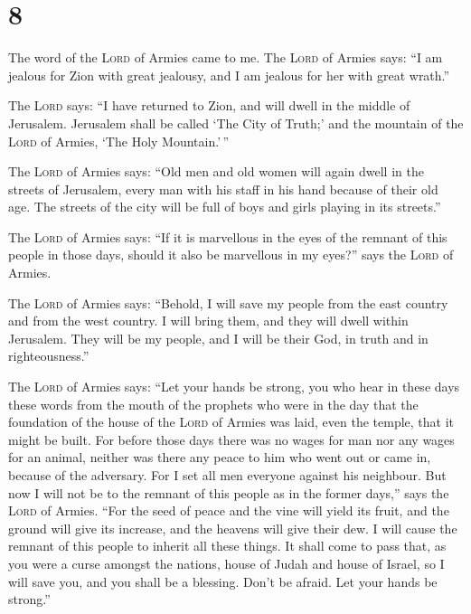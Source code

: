 \hypertarget{section-7}{%
\section{8}\label{section-7}}

 The word of the \textsc{Lord} of Armies came to me.
 The \textsc{Lord} of Armies says: ``I am jealous for Zion
with great jealousy, and I am jealous for her with great wrath.''

 The \textsc{Lord} says: ``I have returned to Zion, and
will dwell in the middle of Jerusalem. Jerusalem shall be called `The
City of Truth;' and the mountain of the \textsc{Lord} of Armies, `The
Holy Mountain.'\,''

 The \textsc{Lord} of Armies says: ``Old men and old women
will again dwell in the streets of Jerusalem, every man with his staff
in his hand because of their old age.  The streets of the
city will be full of boys and girls playing in its streets.''

 The \textsc{Lord} of Armies says: ``If it is marvellous
in the eyes of the remnant of this people in those days, should it also
be marvellous in my eyes?'' says the \textsc{Lord} of Armies.

 The \textsc{Lord} of Armies says: ``Behold, I will save
my people from the east country and from the west country.
 I will bring them, and they will dwell within Jerusalem.
They will be my people, and I will be their God, in truth and in
righteousness.''

 The \textsc{Lord} of Armies says: ``Let your hands be
strong, you who hear in these days these words from the mouth of the
prophets who were in the day that the foundation of the house of the
\textsc{Lord} of Armies was laid, even the temple, that it might be
built.  For before those days there was no wages for man
nor any wages for an animal, neither was there any peace to him who went
out or came in, because of the adversary. For I set all men everyone
against his neighbour.  But now I will not be to the
remnant of this people as in the former days,'' says the \textsc{Lord}
of Armies.  ``For the seed of peace and the vine will
yield its fruit, and the ground will give its increase, and the heavens
will give their dew. I will cause the remnant of this people to inherit
all these things.  It shall come to pass that, as you
were a curse amongst the nations, house of Judah and house of Israel, so
I will save you, and you shall be a blessing. Don't be afraid. Let your
hands be strong.''

